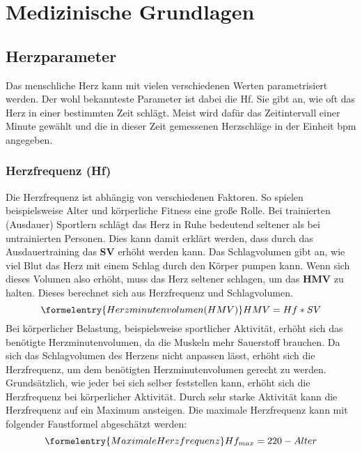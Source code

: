 
\chapter{Medizinische Grundlagen}

\section{Herzparameter}
Das menschliche Herz kann mit vielen verschiedenen Werten parametrisiert werden. Der wohl bekannteste Parameter ist dabei die \ac{Hf}. Sie gibt an, wie oft das Herz in einer bestimmten Zeit schlägt. Meist wird dafür das Zeitintervall einer Minute gewählt und die in dieser Zeit gemessenen Herzschläge in der Einheit \ac{bpm} angegeben. 
\subsection{Herzfrequenz (Hf)} \label {subsec:hf}
Die Herzfrequenz ist abhängig von verschiedenen Faktoren. So spielen beispielsweise Alter und körperliche Fitness eine große Rolle. Bei trainierten (Ausdauer) Sportlern schlägt das Herz in Ruhe bedeutend seltener als bei untrainierten Personen. Dies kann damit erklärt werden, dass durch das Ausdauertraining das \textbf{\ac{SV}} erhöht werden kann. Das Schlagvolumen gibt an, wie viel Blut das Herz mit einem Schlag durch den Körper pumpen kann. Wenn sich dieses Volumen also erhöht, muss das Herz seltener schlagen, um das \textbf{\ac{HMV}} zu halten. Dieses berechnet sich aus Herzfrequenz und Schlagvolumen. \cite{herz} 
\begin{equation}\formelentry{Herzminutenvolumen (HMV)}
	HMV = Hf * SV
\end{equation} 
Bei körperlicher Belastung, beispielsweise sportlicher Aktivität, erhöht sich das benötigte Herzminutenvolumen, da die Muskeln mehr Sauerstoff brauchen. Da sich das Schlagvolumen des Herzens nicht anpassen lässt, erhöht sich die Herzfrequenz, um dem benötigten Herzminutenvolumen gerecht zu werden. Grundsätzlich, wie jeder bei sich selber feststellen kann, erhöht sich die Herzfrequenz bei körperlicher Aktivität. Durch sehr starke Aktivität kann die Herzfrequenz auf ein Maximum ansteigen. Die maximale Herzfrequenz kann mit folgender Faustformel abgeschätzt werden: 
\begin{equation}\formelentry{Maximale Herzfrequenz}
	Hf_{max} = 220 - Alter
\end{equation}
